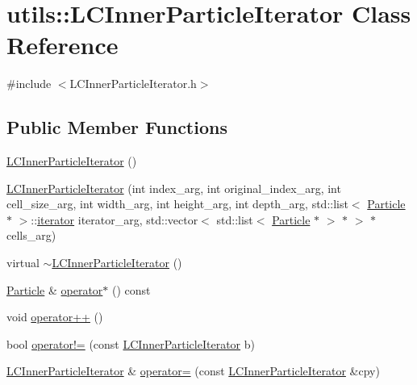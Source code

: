 \hypertarget{classutils_1_1LCInnerParticleIterator}{\section{utils\-:\-:L\-C\-Inner\-Particle\-Iterator Class Reference}
\label{classutils_1_1LCInnerParticleIterator}
}


{\ttfamily \#include $<$L\-C\-Inner\-Particle\-Iterator.\-h$>$}

\subsection*{Public Member Functions}
\begin{DoxyCompactItemize}
\item 
\hyperlink{classutils_1_1LCInnerParticleIterator_a97ed0538282db641bccd20e2700c1b49}{L\-C\-Inner\-Particle\-Iterator} ()
\item 
\hyperlink{classutils_1_1LCInnerParticleIterator_aad380c74a45caefe96d125ccb02b7ecf}{L\-C\-Inner\-Particle\-Iterator} (int index\-\_\-arg, int original\-\_\-index\-\_\-arg, int cell\-\_\-size\-\_\-arg, int width\-\_\-arg, int height\-\_\-arg, int depth\-\_\-arg, std\-::list$<$ \hyperlink{classParticle}{Particle} $\ast$ $>$\-::\hyperlink{classutils_1_1LCInnerParticleIterator_a556926724858f489ff82ba151748bd4d}{iterator} iterator\-\_\-arg, std\-::vector$<$ std\-::list$<$ \hyperlink{classParticle}{Particle} $\ast$ $>$ $\ast$ $>$ $\ast$cells\-\_\-arg)
\item 
virtual \hyperlink{classutils_1_1LCInnerParticleIterator_aeb7069368fc24e7c765348aa2b9cefc9}{$\sim$\-L\-C\-Inner\-Particle\-Iterator} ()
\item 
\hyperlink{classParticle}{Particle} \& \hyperlink{classutils_1_1LCInnerParticleIterator_a3b1af69d0bfe72d9e2c3d59f8735d765}{operator$\ast$} () const 
\item 
void \hyperlink{classutils_1_1LCInnerParticleIterator_a617483a82dcbc3e47da991a6c1c628df}{operator++} ()
\item 
bool \hyperlink{classutils_1_1LCInnerParticleIterator_ac924555155c3d389612b8cf2ed1ce7af}{operator!=} (const \hyperlink{classutils_1_1LCInnerParticleIterator}{L\-C\-Inner\-Particle\-Iterator} b)
\item 
\hyperlink{classutils_1_1LCInnerParticleIterator}{L\-C\-Inner\-Particle\-Iterator} \& \hyperlink{classutils_1_1LCInnerParticleIterator_a23019e15648c8aff3f4f210d09bd3e1d}{operator=} (const \hyperlink{classutils_1_1LCInnerParticleIterator}{L\-C\-Inner\-Particle\-Iterator} \&cpy)

\end{DoxyCompactItemize}
